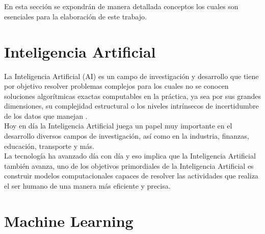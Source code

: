 
\ \\\\
En esta sección se expondrán de manera detallada conceptos los cuales son esenciales para la elaboración de este trabajo.

\section{Inteligencia Artificial}
La Inteligencia Artificial (AI) es un campo de investigación y desarrollo que tiene por objetivo 
resolver problemas complejos para los cuales no se conocen soluciones algorítmicas exactas 
computables en la práctica, ya sea por sus grandes dimensiones, su complejidad estructural o los 
niveles intrínsecos de incertidumbre de los datos que manejan \citep{CT1}.
\\
Hoy en día la Inteligencia Artificial juega un papel muy importante en el desarrollo diversos 
campos de investigación, así como en la industria, finanzas, educación, transporte y más.
\\
La tecnología ha avanzado día con día y eso implica que la Inteligencia Artificial también avanza, 
uno de los objetivos primordiales de la Inteligencia Artificial es construir modelos computacionales 
capaces de resolver las actividades que realiza el ser humano de una manera más eficiente y precisa.


\section{Machine Learning}

